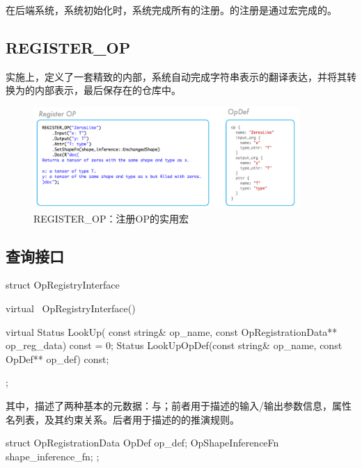 \begin{content}

在\cpp{}后端系统，系统初始化时，系统完成所有的注册。的注册是通过宏完成的。

\subsection{REGISTER\_OP}

实施上，定义了一套精致的内部，系统自动完成字符串表示的翻译表达，并将其转换为的内部表示，最后保存在的仓库中。

\begin{figure}[!h]
\centering
\includegraphics[width=0.9\textwidth]{figures/cc-op-repo.png}
\caption{REGISTER\_OP：注册OP的实用宏}
 \label{fig:cc-op-repo}
\end{figure}

\subsection{查询接口}

\begin{leftbar}
\begin{c++}
struct OpRegistryInterface {
  virtual ~OpRegistryInterface() {}

  virtual Status LookUp(
    const string& op_name,
    const OpRegistrationData** op_reg_data) const = 0;
  Status LookUpOpDef(const string& op_name, const OpDef** op_def) const;
};
\end{c++}
\end{leftbar}

其中，描述了两种基本的元数据：与；前者用于描述的输入/输出参数信息，属性名列表，及其约束关系。后者用于描述的的推演规则。

\begin{leftbar}
\begin{c++}
struct OpRegistrationData {
  OpDef op_def;
  OpShapeInferenceFn shape_inference_fn;
};


\end{c++}
\end{leftbar}
\end{content}
